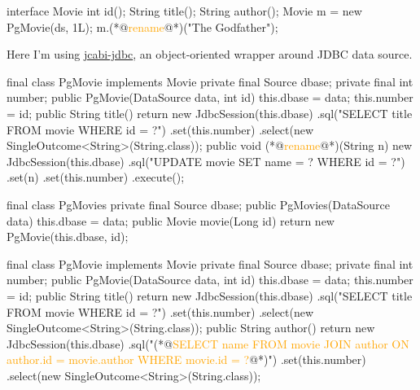 \documentclass{article}
\begin{document}
\begin{pptWide}{2}
{\small\begin{ffcode}
interface Movie {
  int id();
  String title();
  String author();
}
Movie m = new PgMovie(ds, 1L);
m.(*@\textcolor{orange}{rename}@*)("The Godfather");
\end{ffcode}
}
\par
Here I'm using \href{https://github.com/jcabi/jcabi-jdbc}{jcabi-jdbc},
an object-oriented wrapper around JDBC data source.
\par\columnbreak\par
{\scriptsize\begin{ffcode}
final class PgMovie implements Movie
  private final Source dbase;
  private final int number;
  public PgMovie(DataSource data, int id)
    this.dbase = data;
    this.number = id;
  public String title()
    return new JdbcSession(this.dbase)
      .sql("SELECT title FROM movie WHERE id = ?")
      .set(this.number)
      .select(new SingleOutcome<String>(String.class));
  public void (*@\textcolor{orange}{rename}@*)(String n)
    new JdbcSession(this.dbase)
      .sql("UPDATE movie SET name = ? WHERE id = ?")
      .set(n)
      .set(this.number)
      .execute();
\end{ffcode}
}
\end{pptWide}
\par
\plush{}

\begin{pptWide}{2}
{\small\begin{ffcode}
final class PgMovies
  private final Source dbase;
  public PgMovies(DataSource data)
    this.dbase = data;
  public Movie movie(Long id)
    return new PgMovie(this.dbase, id);
\end{ffcode}
}
\par\columnbreak\par
{\scriptsize\begin{ffcode}
final class PgMovie implements Movie
  private final Source dbase;
  private final int number;
  public PgMovie(DataSource data, int id)
    this.dbase = data;
    this.number = id;
  public String title()
    return new JdbcSession(this.dbase)
      .sql("SELECT title FROM movie WHERE id = ?")
      .set(this.number)
      .select(new SingleOutcome<String>(String.class));
  public String author()
    return new JdbcSession(this.dbase)
      .sql("(*@\textcolor{orange}{SELECT name FROM movie JOIN author ON author.id = movie.author WHERE movie.id = ?}@*)")
      .set(this.number)
      .select(new SingleOutcome<String>(String.class));
\end{ffcode}
}
\end{pptWide}
\par
\plush{}
\end{document}
